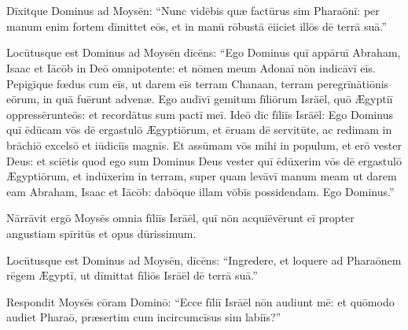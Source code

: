 \chapter{}
\thispagestyle{empty}
Dīxitque Dominus ad Moysēn: ``Nunc vidēbis quæ factūrus
sim Pharaōnī: per manum enim fortem dīmittet eōs, et in
manū rōbustā ēiiciet illōs dē
terrā suā.''

Locūtusque est
Dominus ad Moysēn dīcēns: ``Ego Dominus quī appāruī
Abraham, Isaac et Iācōb in Deō omnipotente:
et nōmen meum Adonaī
nōn indicāvī eīs. 
Pepigīque fœdus cum eīs, ut darem eīs terram
Chanaan, terram peregrīnātiōnis eōrum, in
quā fuērunt advenæ.  Ego audīvī gemitum fīliōrum Isrāēl, quō Ægyptiī
oppressērunt\linebreak eōs:
et recordātus sum pactī meī.  Ideō dīc
fīliīs Isrāēl: Ego Dominus quī ēdūcam vōs dē
ergastulō Ægyptiōrum, et ēruam dē servitūte, ac redimam in
brāchiō excelsō et
iūdiciīs
magnīs.  Et assūmam vōs mihi in populum, et erō vester Deus: et sciētis
quod ego sum Dominus Deus vester quī ēdūxerim vōs dē
ergastulō Ægyptiōrum,  et indūxerim in terram, super quam
levāvī manum meam ut darem eam Abraham, Isaac et Iācōb:
dabōque illam vōbīs possidendam. Ego Dominus.''

Nārrāvit ergō
Moysēs omnia fīliīs Isrāēl, quī nōn
acquiēvērunt eī propter angustiam
spīritūs et opus dūrissimum.  

Locūtusque est Dominus ad
Moysēn, dīcēns:  ``Ingredere, et
loquere ad Pharaōnem rēgem Ægyptī, ut dīmittat fīliōs
Isrāēl dē terrā suā.''

Respondit Moysēs
cōram Dominō: ``Ecce fīliī Isrāēl nōn audiunt mē: et
quōmodo audiet Pharaō, præsertim cum
incircumcīs\-us sim labiīs?''

